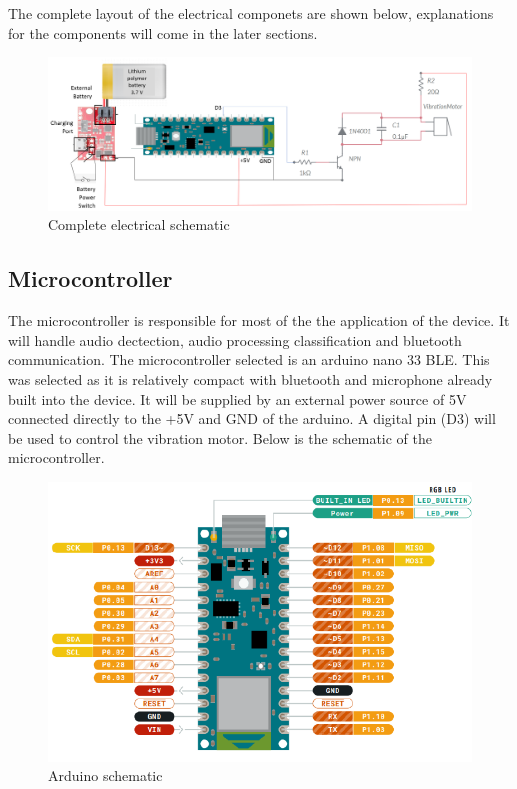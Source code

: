\documentclass[12pt, titlepage]{article}
\begin{document}
\noindent The complete layout of the electrical componets are shown below, explanations for the components will come in the later sections.
\begin{figure}[H]
\centering
  \includegraphics[width=\textwidth,height=\textheight,keepaspectratio]{Schematic.png}
  \caption{Complete electrical schematic}
  \label{schematic} 
\end{figure}

\subsection{Microcontroller}
The microcontroller is responsible for most of the the application of the device. It will handle audio dectection, audio processing classification and bluetooth communication. The microcontroller selected is an arduino nano 33 BLE. This was selected as it is relatively compact with bluetooth and microphone already built into the device. It will be supplied by an external power source of 5V connected directly to the +5V and GND of the arduino. A digital pin (D3) will be used to control the vibration motor. Below is the schematic of the microcontroller.
 \begin{figure}[H]
\centering
  \includegraphics[width=\textwidth,height=\textheight,keepaspectratio]{NanoSchematic.png}
  \caption{Arduino schematic}
  \label{Nanoschematic} 
\end{figure}
\end{document}
